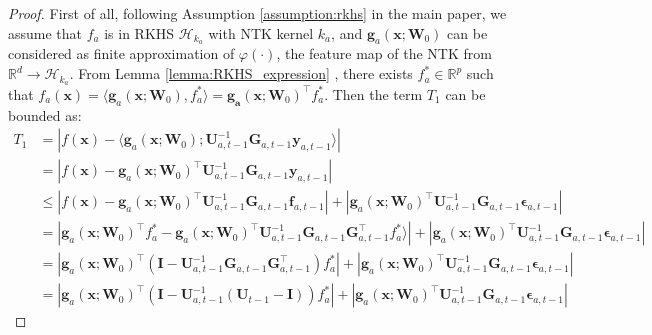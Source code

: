 \begin{proof}
First of all, following Assumption \ref{assumption:rkhs} in the main paper, we assume that $f_a$ is in RKHS $\mathcal{H}_{k_a}$ with NTK kernel $k_a$, and $\mathbf{g}_a(\mathbf{x}; \mathbf{W}_0)$  can be considered as finite approximation of $\varphi(\cdot)$, the feature map of the NTK from $\mathbb{R}^d \rightarrow \mathcal{H}_{k_a}$. From Lemma \ref{lemma:RKHS_expression} , there exists $f_a^* \in \mathbb{R}^p$ such that $f_a(\mathbf{x}) = \langle \mathbf{g}_a(\mathbf{x}; \mathbf{W}_0), f_a^* \rangle = \mathbf{g_a}(\mathbf{x}; \mathbf{W}_0)^\top f_a^*$. 
Then the term $T_1$ can be bounded as:
\begin{align*}
\label{ieqn:neural_cbo_confidence_interval}
         T_1 &= \left \lvert f(\mathbf{x}) - \langle \mathbf{g}_a(\mathbf{x}; \mathbf{W}_0); \mathbf{U}^{-1}_{a,t-1} \mathbf{G}_{a,t-1} \mathbf{y}_{a,t-1} \rangle   \right \rvert  
         \\
         & = \left\lvert f(\mathbf{x}) - \mathbf{g}_a(\mathbf{x}; \mathbf{W}_0)^\top  \mathbf{U}^{-1}_{a,t-1} \mathbf{G}_{a,t-1} \mathbf{y}_{a,t-1} \right\rvert 
         \\
        & \leq \left\lvert f(\mathbf{x}) - \mathbf{g}_a(\mathbf{x}; \mathbf{W}_0)^\top  \mathbf{U}^{-1}_{a,t-1}
        \mathbf{G}_{a,t-1}\mathbf{f}_{a, t-1} \right\rvert + 
        \left\lvert \mathbf{g}_a(\mathbf{x}; \mathbf{W}_0)^\top \mathbf{U}^{-1}_{a,t-1}
        \mathbf{G}_{a,t-1} \boldsymbol{\epsilon}_{a, t-1} \right\rvert
        \\
        & = \left\lvert \mathbf{g}_a(\mathbf{x}; \mathbf{W}_0)^\top f_a^* - \mathbf{g}_a(\mathbf{x}; \mathbf{W}_0)^\top  \mathbf{U}^{-1}_{a,t-1} 
        \mathbf{G}_{a,t-1}
        \mathbf{G}_{a,t-1}^\top f_a^* \rangle \right\rvert + 
        \left\rvert  \mathbf{g}_a(\mathbf{x}; \mathbf{W}_0)^\top \mathbf{U}^{-1}_{a,t-1} \mathbf{G}_{a,t-1} \boldsymbol{\epsilon}_{a, t-1}  \right\rvert
        \\
        & = \left\lvert \mathbf{g}_a(\mathbf{x}; \mathbf{W}_0)^\top \left( \mathbf{I} -  \mathbf{U}^{-1}_{a,t-1}  \mathbf{G}_{a,t-1} \mathbf{G}_{a,t-1}^\top  \right) f_a^*  \right \vert + 
        \left\lvert  \mathbf{g}_a(\mathbf{x}; \mathbf{W}_0)^\top \mathbf{U}^{-1}_{a,t-1} \mathbf{G}_{a,t-1} \boldsymbol{\epsilon}_{a, t-1}  \right\rvert 
        \\
        & = \left\lvert \mathbf{g}_a(\mathbf{x}; \mathbf{W}_0)^\top \left( \mathbf{I} -  \mathbf{U}^{-1}_{a,t-1} \left( \mathbf{U}_{t-1} - \mathbf{I} \right)  \right) f_a^*  \right \vert +
        \left \lvert  \mathbf{g}_a(\mathbf{x}; \mathbf{W}_0)^\top \mathbf{U}^{-1}_{a,t-1} \mathbf{G}_{a,t-1} \boldsymbol{\epsilon}_{a, t-1}  \right \rvert 

\end{align*}
\end{proof}
